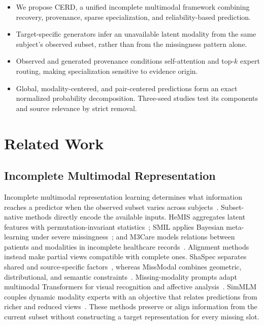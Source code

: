 \documentclass[a4paper,fleqn]{cas-dc}
\begin{document}
\begin{itemize}
    \item We propose CERD, a unified incomplete multimodal framework combining recovery, provenance, sparse specialization, and reliability-based prediction.
    \item Target-specific generators infer an unavailable latent modality from the same subject's observed subset, rather than from the missingness pattern alone.
    \item Observed and generated provenance conditions self-attention and top-\(k\) expert routing, making specialization sensitive to evidence origin.
    \item Global, modality-centered, and pair-centered predictions form an exact normalized probability decomposition. Three-seed studies test its components and source relevance by strict removal.
\end{itemize}

\section{Related Work}
\label{sec:related_works}

\subsection{Incomplete Multimodal Representation}

Incomplete multimodal representation learning determines what information reaches a predictor when the observed subset varies across subjects~\cite{ref_mlmm_survey,ref_wu2024mlmm}. Subset-native methods directly encode the available inputs. HeMIS aggregates latent features with permutation-invariant statistics~\cite{ref_hemis2016}; SMIL applies Bayesian meta-learning under severe missingness~\cite{ref_ma2021smil}; and M3Care models relations between patients and modalities in incomplete healthcare records~\cite{ref_m3care}. Alignment methods instead make partial views compatible with complete ones. ShaSpec separates shared and source-specific factors~\cite{wang2023shaspec}, whereas MissModal combines geometric, distributional, and semantic constraints~\cite{lin2023missmodal}. Missing-modality prompts adapt multimodal Transformers for visual recognition and affective analysis~\cite{lee2023missingprompts,guo2024missingprompts}. SimMLM couples dynamic modality experts with an objective that relates predictions from richer and reduced views~\cite{li2025simmlm}. These methods preserve or align information from the current subset without constructing a target representation for every missing slot.
\end{document}
